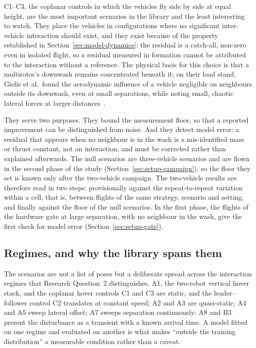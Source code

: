 C1--C3, the coplanar controls in which the vehicles fly side by side at equal height, are the most
important scenarios in the library and the least interesting to watch. They
place the vehicles in configurations where no significant inter-vehicle interaction should exist,
and they exist because of the property established in Section~\ref{sec:model-dynamics}: the
residual is a catch-all, non-zero even in isolated flight, so a residual measured in formation
cannot be attributed to the interaction without a reference.
The physical basis for this choice is that a multirotor's downwash remains concentrated beneath
it; on their load stand, Gielis et al.\ found the aerodynamic influence of a vehicle negligible on
neighbours outside its downwash, even at small separations, while noting small, chaotic lateral
forces at larger distances~\cite{gielis2023aggregate}.

They serve two purposes. They bound the measurement floor, so that a reported improvement can be
distinguished from noise. And they detect model error: a residual that appears when no neighbour is
in the wash is a mis-identified mass or thrust constant, not an interaction, and must be corrected
rather than explained afterwards.
The null scenarios are three-vehicle scenarios and are flown in the second phase of the study
(Section~\ref{sec:setup-campaign}), so the floor they set is known only after the two-vehicle
campaign. The two-vehicle results are therefore read in two steps: provisionally against the
repeat-to-repeat variation within a cell, that is, between flights of the same strategy, scenario
and setting, and finally against the floor of the null scenarios. In the first phase, the flights
of the hardware gate at large separation, with no neighbour in the wash, give the first check for
model error (Section~\ref{sec:setup-gate}).

\subsection{Regimes, and why the library spans them}

The scenarios are not a list of poses but a deliberate spread across the interaction regimes that
Research Question~2 distinguishes. A1, the two-robot vertical hover stack, and the coplanar
hover controls C1 and C3 are static, and the leader--follower control C2 translates at constant
speed; A2 and A3 are quasi-static; A4 and A5
sweep lateral offset; A7 sweeps separation continuously; A8 and B3 present the disturbance as a
transient with a known arrival time. A model fitted on one regime and evaluated on another is what
makes ``outside the training distribution'' a measurable condition rather than a caveat.

